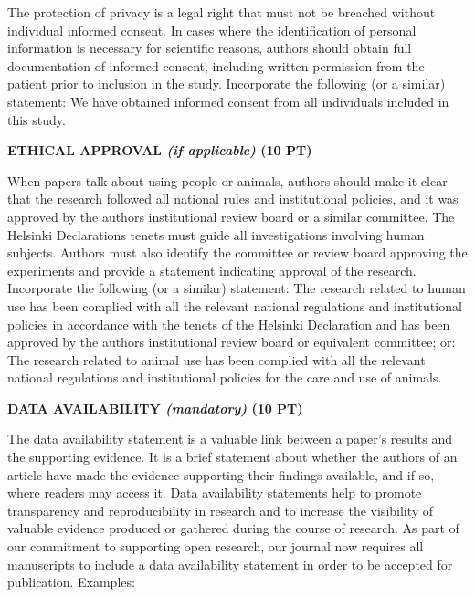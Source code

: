 \documentclass[
]{article}
\begin{document}
The protection of privacy is a legal right that must not be breached without individual informed consent. In cases where the identification of personal information is necessary for scientific reasons, authors should obtain full documentation of informed consent, including written permission from the patient prior to inclusion in the study. Incorporate the following (or a similar) statement: We have obtained informed consent from all individuals included in this study.

\textbf{ETHICAL APPROVAL \emph{(if applicable)} (10 PT)}

When papers talk about using people or animals, authors should make it clear that the research followed all national rules and institutional policies, and it was approved by the authors\textquotesingle{} institutional review board or a similar committee. The Helsinki Declaration\textquotesingle s tenets must guide all investigations involving human subjects. Authors must also identify the committee or review board approving the experiments and provide a statement indicating approval of the research. Incorporate the following (or a similar) statement: The research related to human use has been complied with all the relevant national regulations and institutional policies in accordance with the tenets of the Helsinki Declaration and has been approved by the authors\textquotesingle{} institutional review board or equivalent committee; or: The research related to animal use has been complied with all the relevant national regulations and institutional policies for the care and use of animals.

\textbf{DATA AVAILABILITY \emph{(mandatory)} (10 PT)}

The data availability statement is a valuable link between a paper's results and the supporting evidence. It is a brief statement about whether the authors of an article have made the evidence supporting their findings available, and if so, where readers may access it. Data availability statements help to promote transparency and reproducibility in research and to increase the visibility of valuable evidence produced or gathered during the course of research. As part of our commitment to supporting open research, our journal now requires all manuscripts to include a data availability statement in order to be accepted for publication. Examples:
\end{document}
